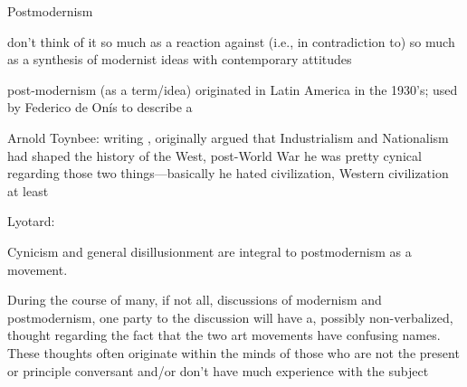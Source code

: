 \documentclass[../butidigress.tex]{subfiles}
\newcounter{worldwarcounter}\setcounter{worldwarcounter}{1}
\begin{document}
\setcounter{worldwarcounter}{2}
\begin{somenotes}{Postmodernism}
    \item don't think of it so much as a reaction against (i.e., in contradiction to) so much as a synthesis of modernist ideas with contemporary attitudes
    \item post-modernism (as a term/idea) originated in Latin America in the 1930's; used by Federico de Onís to describe a \autocite[4]{originspostmodernity}
    \item Arnold Toynbee: writing , originally argued that Industrialism and Nationalism had shaped the history of the West, post-World War  he was pretty cynical regarding those two things---basically he hated civilization, Western civilization at least
    \item Lyotard: \autocite{postmodernsep}
\end{somenotes}

Cynicism and general disillusionment are integral to postmodernism as a movement.


During the course of many, if not all, discussions of modernism and postmodernism, one party to the discussion will have a, possibly non-verbalized, thought regarding the fact that the two art movements have confusing names.
These thoughts often originate within the minds of those who are not the present or principle conversant and/or don't have much experience with the subject


\end{document}
